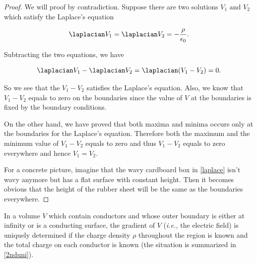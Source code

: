 \documentclass[english,a4paper,12pt]{report}
\begin{document}
\begin{proof}
We will proof by contradiction. Suppose there are two solutions \(V_1 \text{ and } V_2\) which satisfy the Laplace's equation

\begin{equation}
    \laplacian V_1 = \laplacian V_2 = -\frac{\rho }{\epsilon_0} .
\end{equation}

Subtracting the two equations, we have 

\begin{equation}
    \laplacian V_1 - \laplacian V_2 = \laplacian (V_1 - V_2) = 0.
\end{equation}

So we see that the \(V_1 - V_2\) satisfies the Laplace's equation. Also, we know that \(V_1 - V_2\) equals to zero on the boundaries since the value of \(V\) at the boundaries is fixed by the boundary conditions. 

On the other hand, we have proved that both maxima and minima occurs only at the boundaries for the Laplace's equation. Therefore both the maximum and the minimum value of \(V_1 - V_2\) equals to zero and thus \(V_1 - V_2\) equals to zero everywhere and hence \(V_1 = V_2\). 

For a concrete picture, imagine that the wavy cardboard box in \cref{laplace} isn't wavy anymore but has a flat surface with constant height. Then it becomes obvious that the height of the rubber sheet will be the same as the boundaries everywhere.

\end{proof}

\begin{theorem}
In a volume \(V\) which contain conductors and whose outer boundary is either at infinity or is a conducting surface, the gradient of \(V\) (\textit{i.e.,} the electric field) is uniquely determined if the charge density \(\rho \) throughout the region is known and the total charge on each conductor is known (the situation is summarized in \cref{2nduni}).


\end{theorem}
\end{document}
